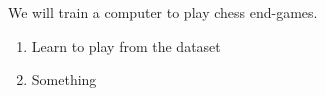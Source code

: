 We will train a computer to play chess end-games.
\begin{enumerate}
    \item Learn to play from the dataset
    \item Something
\end{enumerate}
